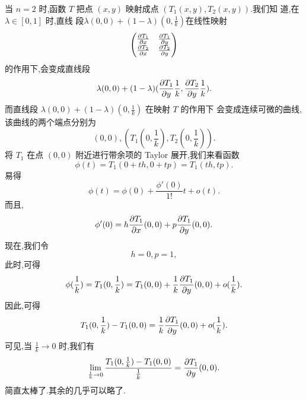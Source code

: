\documentclass[a4paper, 12pt]{article} %
\begin{document}
当 $n=2$ 时,函数 $T$ 把点 $(x,y)$ 映射成点 $(T_1(x,y),T_2(x,y))$.我们知
道,在 $\lambda\in [0,1]$ 时,直线
段$\lambda(0,0)+(1-\lambda)(0,\frac{1}{k})$在线性映射
$$
\begin{pmatrix}
  \frac{\partial T_1}{\partial x}&\frac{\partial T_1}{\partial y}\\
  \frac{\partial T_2}{\partial x}&\frac{\partial T_2}{\partial y}
\end{pmatrix}
$$
的作用下,会变成直线段
$$
\lambda (0,0)+(1-\lambda)(\frac{\partial T_{1}}{\partial y}\frac{1}{k},\frac{\partial
  T_2}{\partial y}\frac{1}{k}).
$$
而直线段 $\lambda (0,0)+(1-\lambda)(0,\frac{1}{k})$ 在映射 $T$ 的作用下
会变成连续可微的曲线,该曲线的两个端点分别为
$$
(0,0),(T_1(0,\frac{1}{k}),T_2(0,\frac{1}{k})).
$$
将 $T_1$ 在点 $(0,0)$ 附近进行带余项的 Taylor 展开,我们来看函数
$$
\phi(t)=T_1(0+th,0+tp)=T_1(th,tp).
$$
易得
$$
\phi(t)=\phi(0)+\frac{\phi'(0)}{1!}t+o(t).
$$
而且,
$$
\phi'(0)=h\frac{\partial T_1}{\partial x}(0,0)+p \frac{\partial T_1}{\partial y}(0,0).
$$
现在,我们令
$$
h=0,p=1,
$$
此时,可得
$$
\phi(\frac{1}{k})=T_1(0,\frac{1}{k})=T_1(0,0)+\frac{1}{k}\frac{\partial T_1}{\partial y}(0,0)+o(\frac{1}{k}).
$$
因此,可得
$$
T_1(0,\frac{1}{k})-T_1(0,0)=\frac{1}{k} \frac{\partial T_1}{\partial y}(0,0)+o(\frac{1}{k}).
$$
可见,当 $\frac{1}{k}\to 0$ 时,我们有
$$
\lim_{\frac{1}{k}\to 0}\frac{T_1(0,\frac{1}{k})-T_1(0,0)}{\frac{1}{k}}=\frac{\partial T_1}{\partial y}(0,0).
$$
简直太棒了.其余的几乎可以略了.

  

  
\end{document}
